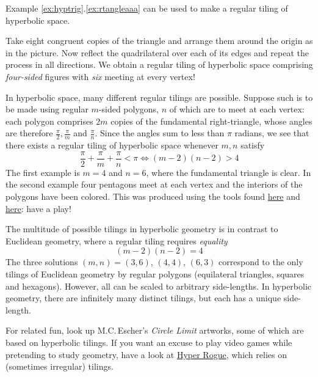 \label{pg:hyptiling}

Example \ref*{ex:hyptrig}.\ref{ex:rtangleaaa} can be used to make a regular tiling of hyperbolic space.\par

\begin{minipage}[t]{0.55\linewidth}\vspace{0pt}
	Take eight congruent copies of the triangle and arrange them around the origin as in the picture. Now reflect the quadrilateral over each of its edges and repeat the process in all directions. We obtain a regular tiling of hyperbolic space comprising \emph{four-sided} figures with \emph{six} meeting at every vertex!\medbreak
	
	In hyperbolic space, many different regular tilings are possible. Suppose such is to be made using regular $m$-sided polygons, $n$ of which are to meet at each vertex: each polygon comprises $2m$ copies of the fundamental right-triangle, whose angles are therefore $\frac\pi 2, \frac\pi m$ and $\frac\pi n$.
	Since the angles sum to less than $\pi$ radians, we see that there exists a regular tiling of hyperbolic space whenever $m,n$ satisfy
	\[
		\frac\pi 2+\frac\pi m+\frac\pi n<\pi\iff (m-2)(n-2)>4
	\]
	The first example is $m=4$ and $n=6$, where the fundamental triangle is clear. In the second example four pentagons meet at each vertex and the interiors of the polygons have been colored. This was produced using the tools found
	\href{http://www.malinc.se/noneuclidean/en/poincaretiling.php}{here} and \href{http://www.malinc.se/m/ImageTiling.php}{here}: have a play!\medbreak
	
	The multitude of possible tilings in hyperbolic geometry is in contrast to Euclidean geometry, where a regular tiling requires \emph{equality}
	\[
		(m-2)(n-2)=4
	\]
	The three solutions $(m,n)=(3,6)$, $(4,4)$, $(6,3)$ correspond to the only tilings of Euclidean geometry by regular polygons (equilateral triangles, squares and hexagons). However, all can be scaled to arbitrary side-lengths. In hyperbolic geometry, there are infinitely many distinct tilings, but each has a unique side-length.\bigbreak
	
	For related fun, look up M.C.\,Escher's \emph{Circle Limit} artworks, some of which are based on hyperbolic tilings.
	If you want an excuse to play video games while pretending to study geometry, have a look at \href{http://www.roguetemple.com/z/hyper/}{Hyper Rogue}, which relies on (sometimes irregular) tilings.
\end{minipage}
